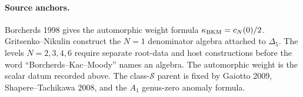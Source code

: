 \paragraph{Source anchors.}
Borcherds 1998 gives the automorphic weight formula
$\kappa_{\mathrm{BKM}}=c_N(0)/2$.  Gritsenko--Nikulin construct the $N=1$ denominator
algebra attached to $\Delta_5$.  The levels $N=2,3,4,6$ require
separate root-data and host constructions before the word
``Borcherds--Kac--Moody'' names an algebra.  The automorphic weight is
the scalar datum recorded above.  The class-$\mathcal S$ parent is fixed by Gaiotto 2009,
Shapere--Tachikawa 2008, and the $A_1$ genus-zero anomaly formula.
